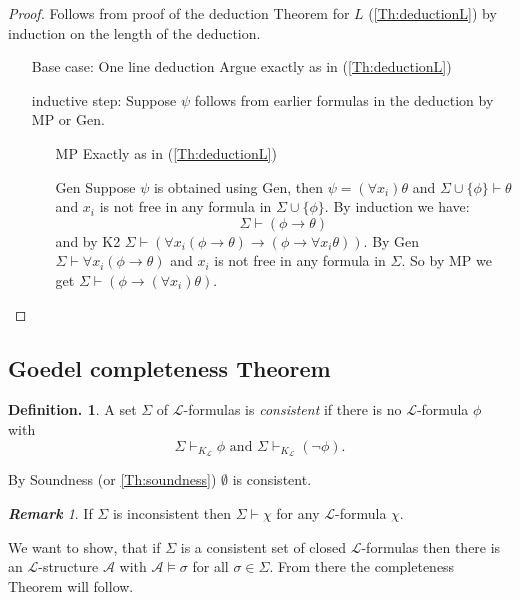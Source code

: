 \documentclass[a4paper,oneside,11pt,DIV=12,parskip=half]{scrartcl}
\newcommand{\LL}{\mathcal L}
\newcommand{\A}{\mathcal A}
\theoremstyle{plain}
\theoremstyle{definition}
\newtheorem{definition}[theorem]{Definition.}
\newtheorem{remark, definition}[theorem]{Remark and Definition.}
\newtheorem{lemma, definition}[theorem]{Lemma and Definition.}
\newtheorem{theorem, definition}[theorem]{Theorem and Definition.}
\theoremstyle{remark}
\newtheorem*{remark}{\textbf{Remark}}
\newtheorem*{remark, example}{\textbf{Remark and Exercise}}
\begin{document}
\begin{proof}
Follows from proof of the deduction Theorem for $L$ (\ref{Th:deductionL}) by induction on the length of the deduction.

\begin{enumerate}
    \item[Base case:] One line deduction Argue exactly as in (\ref{Th:deductionL})
    \item[inductive step:] Suppose $\psi$ follows from earlier formulas in the deduction by MP or Gen.
        \begin{itemize}
            \item[MP] Exactly as in (\ref{Th:deductionL})
            \item[Gen] Suppose $\psi$ is obtained using Gen, then $\psi = (\forall x_i) \theta$ and $\Sigma \cup \{ \phi \} \vdash \theta$ and $x_i$ is not free in any formula in $\Sigma \cup \{ \phi \}$.
            By induction we have:
            \[ \Sigma \vdash (\phi \rightarrow \theta) \]
            and by K2 $\Sigma \vdash (\forall x_i(\phi \rightarrow \theta) \rightarrow (\phi \rightarrow \forall x_i \theta)).$
            By Gen $\Sigma \vdash \forall x_i (\phi \rightarrow \theta)$ and $x_i$ is not free  in any formula in $\Sigma$.
            So by MP we get $\Sigma \vdash (\phi \rightarrow (\forall x_i) \theta)$. 
        \end{itemize}
\end{enumerate}
\end{proof}

\subsection{Goedel completeness Theorem}

\begin{definition}
 A set $\Sigma$ of $\LL$-formulas is \emph{consistent} if there is no $\LL$-formula $\phi$ with
    \[ \Sigma \vdash_{K_\LL} \phi \text{ and }  \Sigma \vdash_{K_\LL} (\lnot \phi). \]
    
    By Soundness (or \ref{Th:soundness}) $\emptyset$ is consistent.
\end{definition}

\begin{remark}
If $\Sigma$ is inconsistent then $\Sigma \vdash \chi$ for any $\LL$-formula $\chi$.
\end{remark}

We want to show, that if $\Sigma$ is a consistent set of closed $\LL$-formulas then there is an $\LL$-structure $\A$ with $\A \vDash \sigma$ for all $\sigma \in \Sigma$. From there the completeness Theorem will follow.
\end{document}

